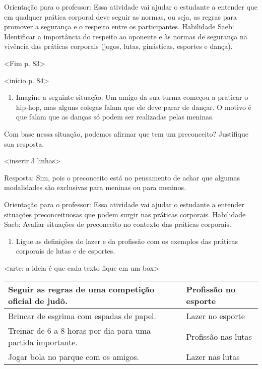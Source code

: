Orientação para o professor: Essa atividade vai ajudar o estudante a
entender que em qualquer prática corporal deve seguir as normas, ou
seja, as regras para promover a segurança e o respeito entre os
participantes. Habilidade Saeb: Identificar a importância do respeito ao
oponente e às normas de segurança na vivência das práticas corporais
(jogos, lutas, ginásticas, esportes e dança).

\textless{}Fim p. 83\textgreater{}

\textless{}início p. 84\textgreater{}

\begin{enumerate}
\def\labelenumi{\arabic{enumi}.}
\item
  Imagine a seguinte situação: Um amigo da sua turma começou a praticar
  o hip-hop, mas alguns colegas falam que ele deve parar de dançar. O
  motivo é que falam que as danças só podem ser realizadas pelas
  meninas.
\end{enumerate}

Com base nessa situação, podemos afirmar que tem um preconceito?
Justifique sua resposta.

\textless{}inserir 3 linhas\textgreater{}

Resposta: Sim, pois o preconceito está no pensamento de achar que
algumas modalidades são exclusivas para meninas ou para meninos.

Orientação para o professor: Essa atividade vai ajudar o estudante a
entender situações preconceituosas que podem surgir nas práticas
corporais. Habilidade Saeb: Avaliar situações de preconceito no contexto
das práticas corporais.

\begin{enumerate}
\def\labelenumi{\arabic{enumi}.}
\item
  Ligue as definições do lazer e da profissão com os exemplos das
  práticas corporais de lutas e de esportes.
\end{enumerate}

\textless{}arte: a ideia é que cada texto fique em um box\textgreater{}

\begin{longtable}[]{@{}lll@{}}
\toprule
Seguir as regras de uma competição oficial de judô. & & Profissão no
esporte\tabularnewline
\midrule
\endhead
Brincar de esgrima com espadas de papel. & & Lazer no
esporte\tabularnewline
Treinar de 6 a 8 horas por dia para uma partida importante. & &
Profissão nas lutas\tabularnewline
Jogar bola no parque com os amigos. & & Lazer nas lutas\tabularnewline
\bottomrule
\end{longtable}

